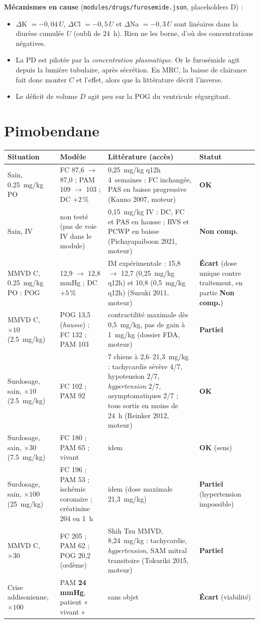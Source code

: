 \documentclass[10pt,a4paper]{article}
\newcommand{\cmd}[1]{\texttt{#1}}
\newcommand{\ok}{\textcolor{green!45!black}{\textbf{OK}}}
\newcommand{\ecart}{\textcolor{red!70!black}{\textbf{Écart}}}
\newcommand{\partiel}{\textcolor{orange!80!black}{\textbf{Partiel}}}
\newcommand{\nc}{\textcolor{black!60}{\textbf{Non comp.}}}
\begin{document}
\textbf{Mécanismes en cause} (\cmd{modules/drugs/furosemide.json}, placeholders D) :
\begin{itemize}
\item $\Delta$K $=-0{,}04\,U$, $\Delta$Cl $=-0{,}5\,U$ et $\Delta$Na $=-0{,}3\,U$ sont linéaires dans la diurèse cumulée $U$ (oubli de 24~h). Rien ne les borne, d'où des concentrations négatives.
\item La PD est pilotée par la \emph{concentration plasmatique}. Or le furosémide agit depuis la lumière tubulaire, après sécrétion. En MRC, la baisse de clairance fait donc monter $C$ et l'effet, alors que la littérature décrit l'inverse.
\item Le déficit de volume $D$ agit peu sur la POG du ventricule régurgitant.
\end{itemize}

\section{Pimobendane}

\begin{tabularx}{\linewidth}{@{}P{3.4cm}P{4.3cm}LP{1.8cm}@{}}
\toprule
Situation & Modèle & Littérature (accès) & Statut\\
\midrule\endhead
Sain, \SI{0,25}{mg/kg} PO & FC 87,6 $\rightarrow$ 87,0 ; PAM 109 $\rightarrow$ 103 ; DC $+2$\,\% & 0,25~mg/kg q12h 4~semaines : FC inchangée, PAS en baisse progressive (Kanno 2007, moteur) & \ok{}\\
Sain, IV & non testé (pas de voie IV dans le module) & 0,15~mg/kg IV : DC, FC et PAS en hausse ; RVS et PCWP en baisse (Pichayapaiboon 2021, moteur) & \nc{}\\
MMVD C, \SI{0,25}{mg/kg} PO : POG & 12,9 $\rightarrow$ 12,8 mmHg ; DC $+5$\,\% & IM expérimentale : 15,8 $\rightarrow$ 12,7 (0,25~mg/kg q12h) et 10,8 (0,5~mg/kg q12h) (Suzuki 2011, moteur) & \ecart{} (dose unique contre traitement, en partie \nc{})\\
MMVD C, $\times 10$ (\SI{2,5}{mg/kg}) & POG 13,5 (\emph{hausse}) ; FC 132 ; PAM 103 & contractilité maximale dès 0,5~mg/kg, pas de gain à 1~mg/kg (dossier FDA, moteur) & \partiel{}\\
Surdosage, sain, $\times 10$ (\SI{2,5}{mg/kg}) & FC 102 ; PAM 92 & 7 chiens à 2,6--21,3~mg/kg : tachycardie sévère 4/7, hypotension 2/7, \emph{hypertension} 2/7, asymptomatiques 2/7 ; tous sortis en moins de 24~h (Reinker 2012, moteur) & \ok{}\\
Surdosage, sain, $\times 30$ (\SI{7,5}{mg/kg}) & FC 180 ; PAM 65 ; vivant & idem & \ok{} (sens)\\
Surdosage, sain, $\times 100$ (\SI{25}{mg/kg}) & FC 196 ; PAM 53 ; ischémie coronaire ; créatinine 204 en 1~h & idem (dose maximale 21,3~mg/kg) & \partiel{} (hypertension impossible)\\
MMVD C, $\times 30$ & FC 205 ; PAM 62 ; POG 20,2 (œdème) & Shih Tzu MMVD, 8,24~mg/kg : tachycardie, \emph{hypertension}, SAM mitral transitoire (Tokuriki 2015, moteur) & \partiel{}\\
Crise addisonienne, $\times 100$ & PAM \textbf{24 mmHg}, patient « vivant » & sans objet & \ecart{} (viabilité)\\
\bottomrule
\end{tabularx}
\end{document}
